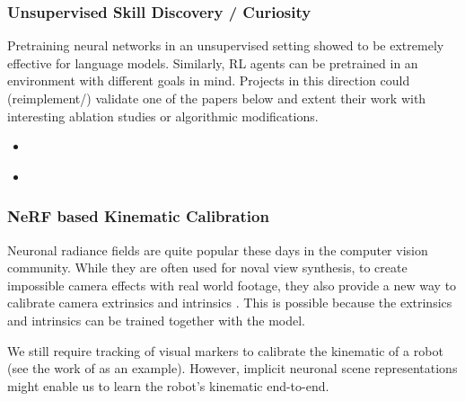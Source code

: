 \documentclass[a4paper]{article}
\begin{document}
\subsubsection{Unsupervised Skill Discovery / Curiosity}
Pretraining neural networks in an unsupervised setting showed to be extremely effective for language models. Similarly, RL agents can be pretrained in an environment with different goals in mind. Projects in this direction could (reimplement/) validate one of the papers below and extent their work with interesting ablation studies or algorithmic modifications.
\begin{itemize}
  \item \cite{Plan2Explore2020}
  \item \cite{DADS2020}
\end{itemize}


\subsubsection{NeRF based Kinematic Calibration}
Neuronal radiance fields are quite popular these days in the computer vision community. While they are often used for noval view synthesis, to create impossible camera effects with real world footage, they also provide a new way to calibrate camera extrinsics and intrinsics \cite{lin2021barf, Sucar:etal:ICCV2021, wang2021nerfmm, SCNeRF2021}.
This is possible because the extrinsics and intrinsics can be trained together with the model.

We still require tracking of visual markers to calibrate the kinematic of a robot (see the work of \cite{Birbach2014} as an example).
However, implicit neuronal scene representations might enable us to learn the robot's kinematic end-to-end.
\end{document}
